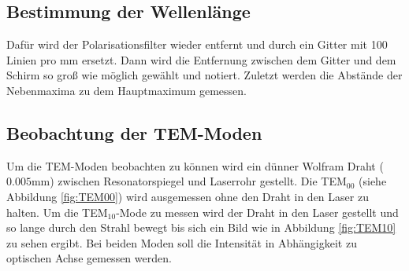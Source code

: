 \subsection{Bestimmung der Wellenlänge}
Dafür wird der Polarisationsfilter wieder entfernt und durch ein Gitter mit 100 Linien pro mm ersetzt. Dann wird die Entfernung zwischen dem Gitter und dem Schirm so groß wie möglich gewählt und notiert. Zuletzt werden die Abstände der Nebenmaxima zu dem Hauptmaximum gemessen.

\subsection{Beobachtung der TEM-Moden}
Um die TEM-Moden beobachten zu können wird ein dünner Wolfram Draht ($0.005$mm) zwischen Resonatorspiegel und Laserrohr gestellt. Die TEM$_{00}$ (siehe Abbildung \eqref{fig:TEM00}) wird ausgemessen ohne den Draht in den Laser zu halten. Um die TEM$_{10}$-Mode zu messen wird der Draht in den Laser gestellt und so lange durch den Strahl bewegt bis sich ein Bild wie in Abbildung \eqref{fig:TEM10} zu sehen ergibt. Bei beiden Moden soll die Intensität in Abhängigkeit zu optischen Achse gemessen werden.

